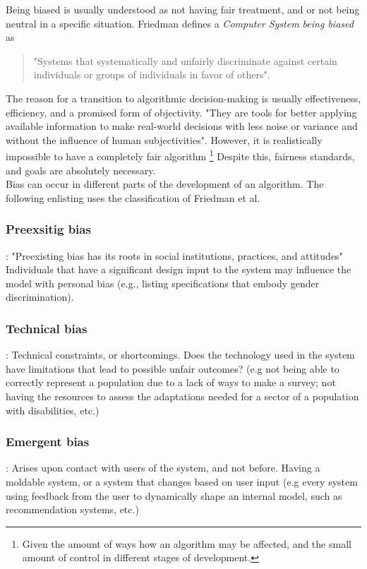 Being biased is usually understood as not having fair treatment, and or not being neutral in a specific situation. Friedman defines a \textsl{Computer System being biased} as \begin{quote}"Systems that systematically and unfairly discriminate against certain individuals or groups of individuals in favor of others"\cite{Compsysbias}.\end{quote} The reason for a transition to algorithmic decision-making is usually effectiveness, efficiency, and a promised form of objectivity. "They are tools for better
applying available information to make real-world decisions with less noise or variance
and without the influence of human subjectivities"\cite{OBS*19}. However, it is realistically impossible to have a completely fair algorithm \footnote{Given the amount of ways how an algorithm may be affected, and the small amount of control in different stages of development.} Despite this, fairness standards, and goals are absolutely necessary.\\
Bias can occur in different parts of the development of an algorithm. The following enlisting uses the classification of Friedman et al.\cite{Compsysbias}

\subsubsection{Preexsitig bias}: \label{PreexsitingBias}
"Preexisting bias has its roots in social institutions, practices, and attitudes"\cite{Compsysbias}
Individuals that have a significant design input to the system may influence the model with personal bias (e.g., listing specifications that embody gender discrimination).
\subsubsection{Technical bias}: \label{TechnicalBias}
Technical constraints, or shortcomings. Does the technology used in the system have limitations that lead to possible unfair outcomes? (e.g not being able to correctly represent a population due to a lack of ways to make a survey; not having the resources to assess the adaptations needed for a sector of a population with disabilities, etc.)
\subsubsection{Emergent bias}: \label{EmergentBias}
Arises upon contact with users of the system, and not before. Having a moldable system, or a system that changes based on user input (e.g every system using feedback from the user to dynamically shape an internal model, such as recommendation systems, etc.)

